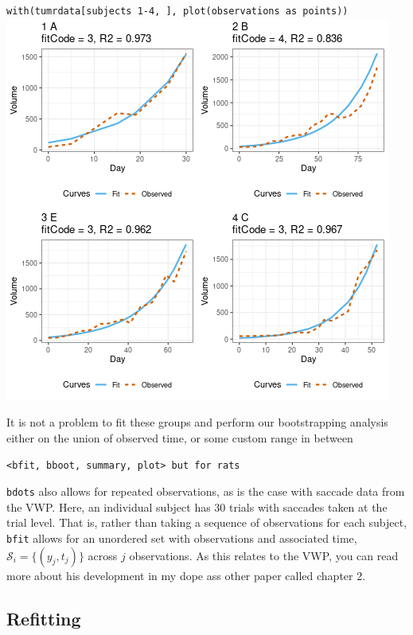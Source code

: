 \documentclass{article}
\begin{document}
\begin{center}
\texttt{with(tumrdata[subjects 1-4, ], plot(observations as points))}
\includegraphics[scale=0.75]{img/mouse.png}
\end{center}



It is not a problem to fit these groups and perform our bootstrapping analysis either on the union of observed time, or some custom range in between

\begin{center}
\texttt{<bfit, bboot, summary, plot> but for rats}
\end{center}

\texttt{bdots} also allows for repeated observations, as is the case with saccade data from the VWP. Here, an individual subject has 30 trials with saccades taken at the trial level. That is, rather than taking a sequence of observations for each subject, \texttt{bfit} allows for an unordered set with observations and associated time, $\mathcal{S}_i = \{(y_j, t_j)\}$ across $j$ observations. As this relates to the VWP, you can read more about his development in my dope ass other paper called chapter 2.


\subsection{Refitting}
\end{document}
